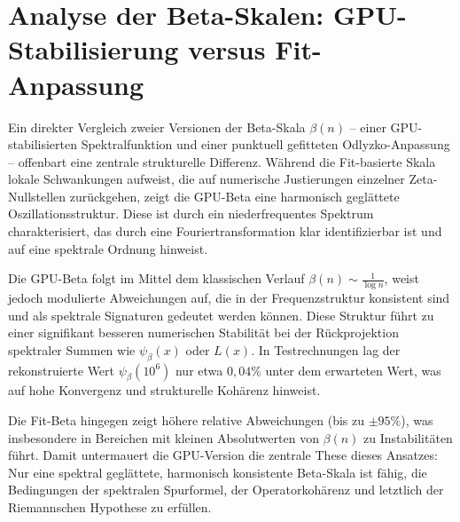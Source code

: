 \section*{Analyse der Beta-Skalen: GPU-Stabilisierung versus Fit-Anpassung}

Ein direkter Vergleich zweier Versionen der Beta-Skala $\beta(n)$ – einer GPU-stabilisierten Spektralfunktion und einer punktuell gefitteten Odlyzko-Anpassung – offenbart eine zentrale strukturelle Differenz. Während die Fit-basierte Skala lokale Schwankungen aufweist, die auf numerische Justierungen einzelner Zeta-Nullstellen zurückgehen, zeigt die GPU-Beta eine harmonisch geglättete Oszillationsstruktur. Diese ist durch ein niederfrequentes Spektrum charakterisiert, das durch eine Fouriertransformation klar identifizierbar ist und auf eine spektrale Ordnung hinweist.

Die GPU-Beta folgt im Mittel dem klassischen Verlauf $\beta(n) \sim \frac{1}{\log n}$, weist jedoch modulierte Abweichungen auf, die in der Frequenzstruktur konsistent sind und als spektrale Signaturen gedeutet werden können. Diese Struktur führt zu einer signifikant besseren numerischen Stabilität bei der Rückprojektion spektraler Summen wie $\psi_\beta(x)$ oder $L(x)$. In Testrechnungen lag der rekonstruierte Wert $\psi_\beta(10^6)$ nur etwa $0{,}04\%$ unter dem erwarteten Wert, was auf hohe Konvergenz und strukturelle Kohärenz hinweist.

Die Fit-Beta hingegen zeigt höhere relative Abweichungen (bis zu $\pm95\%$), was insbesondere in Bereichen mit kleinen Absolutwerten von $\beta(n)$ zu Instabilitäten führt. Damit untermauert die GPU-Version die zentrale These dieses Ansatzes: Nur eine spektral geglättete, harmonisch konsistente Beta-Skala ist fähig, die Bedingungen der spektralen Spurformel, der Operatorkohärenz und letztlich der Riemannschen Hypothese zu erfüllen.